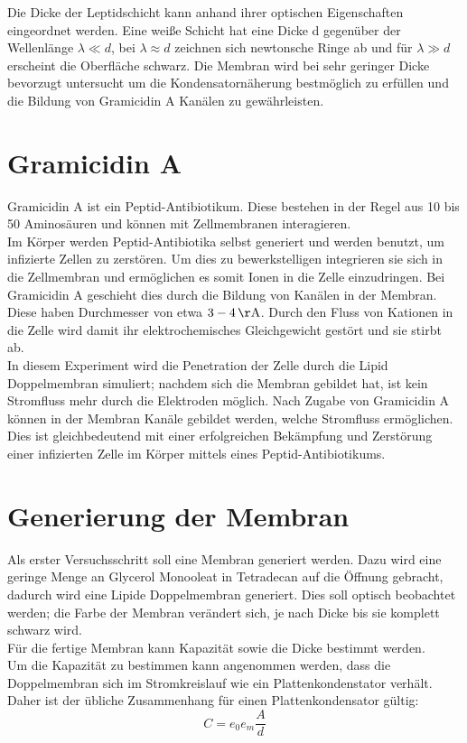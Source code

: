 \documentclass{include/thesisclass3}
\newcommand{\e}[1]{\,\si{#1}}
\begin{document}
Die Dicke der Leptidschicht kann anhand ihrer optischen Eigenschaften eingeordnet werden. Eine weiße Schicht hat eine Dicke d gegenüber der Wellenlänge $\lambda \ll d$, bei $\lambda \approx d$ zeichnen sich newtonsche Ringe ab und für $\lambda \gg d$ erscheint die Oberfläche schwarz. Die Membran wird bei sehr geringer Dicke bevorzugt untersucht um die Kondensatornäherung bestmöglich zu erfüllen und die Bildung von Gramicidin A Kanälen zu gewährleisten.

\section{Gramicidin A}
Gramicidin A ist ein Peptid-Antibiotikum. Diese bestehen in der Regel aus 10 bis 50 Aminosäuren und können mit Zellmembranen interagieren.\\
Im Körper werden Peptid-Antibiotika selbst generiert und werden benutzt, um infizierte Zellen zu zerstören.  Um dies zu bewerkstelligen integrieren sie sich in die Zellmembran und ermöglichen es somit Ionen in die Zelle einzudringen. Bei Gramicidin A geschieht dies durch die Bildung von Kanälen in der Membran. Diese haben Durchmesser von etwa $3 - 4\e{\AA}$. Durch den Fluss von Kationen in die Zelle wird damit ihr elektrochemisches Gleichgewicht gestört und sie stirbt ab.\\
In diesem Experiment wird die Penetration der Zelle durch die Lipid Doppelmembran simuliert; nachdem sich die Membran gebildet hat, ist kein Stromfluss mehr durch die Elektroden möglich. Nach Zugabe von Gramicidin A können in der Membran Kanäle gebildet werden, welche Stromfluss ermöglichen. Dies ist gleichbedeutend mit einer erfolgreichen Bekämpfung und Zerstörung einer infizierten Zelle im Körper mittels eines Peptid-Antibiotikums.




\section{Generierung der Membran}
Als erster Versuchsschritt soll eine Membran generiert werden. Dazu wird eine geringe Menge an Glycerol Monooleat in Tetradecan auf die Öffnung gebracht, dadurch wird eine Lipide Doppelmembran generiert. Dies soll optisch beobachtet werden; die Farbe der Membran verändert sich, je nach Dicke bis sie komplett schwarz wird.\\
Für die fertige Membran kann Kapazität sowie die Dicke bestimmt werden.\\Um die Kapazität zu bestimmen kann angenommen werden, dass die Doppelmembran  sich im Stromkreislauf wie ein Plattenkondenstator verhält. Daher ist der übliche Zusammenhang für einen Plattenkondensator gültig:
\begin{equation}
C = e_0e_m \frac{A}{d}
\end{equation}
\end{document}
